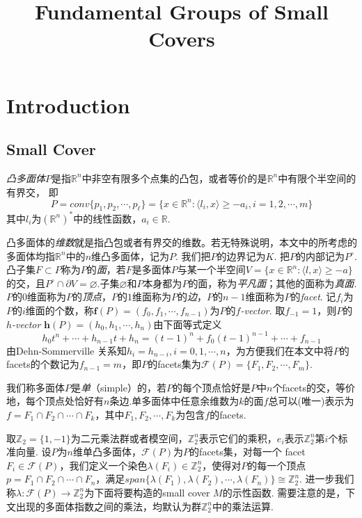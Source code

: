 \documentclass{article}
\title{Fundamental Groups of Small Covers}
\date{}
\theoremstyle{plain}%
\theoremstyle{definition}
\theoremstyle{remark}
\begin{document}
\maketitle
\section{Introduction}
\subsection{Small Cover}
{\em 凸多面体$P$}是指$\mathbb{R}^n$中非空有限多个点集的凸包，或者等价的是$\mathbb{R}^n$中有限个半空间的有界交，
即
$$P=conv\{p_1,p_2,\cdots,p_{\ell}\}=\{x\in \mathbb{R}^n :\langle l_i,x\rangle\geq -a_i,i=1,2,\cdots,m\}$$
其中$l_i$为$(\mathbb{R}^n)^*$中的线性函数，$a_i\in \mathbb{R}$.

凸多面体的{\em 维数}就是指凸包或者有界交的维数。若无特殊说明，本文中的所考虑的多面体均指$\mathbb{R}^n$中的$n$维凸多面体，记为$P$. 我们把$P$的边界记为$K$. 把$P$的内部记为$P^{\circ}$. 凸子集$F\subset P$称为$P$的{\em 面}，若$F$是多面体$P$与某一个半空间$V=\{x\in \mathbb{R}^n :\langle l,x\rangle\geq -a\}$的交，且$P^{\circ}\cap \partial V =\varnothing$.子集$\varnothing$和$P$本身都为$P$的面，称为{\em 平凡面}；其他的面称为{\em 真面}. $P$的$0$维面称为$P$的{\em 顶点}，$P$的$1$维面称为$P$的{\em 边}，$P$的$n-1$维面称为$P$的{\em facet}. 记$f_i$为$P$的$i$维面的个数，称$\mathbf{f}(P)=(f_0,f_1,\cdots,f_{n-1})$为$P$的{\em $f$-vector}. 取$f_{-1}=1$，则$P$的{\em $h$-vector} $\mathbf{h}(P)=(h_0,h_1,\cdots,h_n)$由下面等式定义
$$h_0 t^n+\cdots+h_{n-1}t+h_n=(t-1)^n+f_0(t-1)^{n-1}+\cdots+f_{n-1}$$
由Dehn-Sommerville 关系知$h_i=h_{n-i},i=0,1,\cdots,n$，为方便我们在本文中将$P$的facets的个数记为$f_{n-1}=m$，即$P$的facets集为$\mathcal{F}(P)=\{F_1,F_2,\cdots,F_m\}$.

我们称多面体$P$是{\em 单}（simple）的，若$P$的每个顶点恰好是$P$中$n$个facets的交，等价地，每个顶点处恰好有$n$条边.单多面体中任意余维数为$k$的面$f$总可以(唯一)表示为$f=F_1\cap F_2 \cap \cdots \cap F_k$，其中$F_1,F_2,\cdots,F_k$为包含$f$的facets.


取$\mathbb{Z}_2=\{1,-1\}$为二元乘法群或者模空间，$\mathbb{Z}_2^n$表示它们的乘积，$e_i$表示$\mathbb{Z}_2^n$第$i$个标准向量. 
设$P$为$n$维单凸多面体，$\mathcal{F}(P)$为$P$的facets集，对每一个 facet $F_i\in \mathcal{F}(P)$，我们定义一个染色$\lambda(F_i)\in \mathbb{Z}_2^n$，使得对$P$的每一个顶点$p=F_1\cap F_2 \cap \cdots \cap F_n$，满足$span\{\lambda(F_1),\lambda(F_2),\cdots,\lambda(F_n)\}\cong \mathbb{Z}_2^n$. 进一步我们称$\lambda:\mathcal{F}(P)\longrightarrow \mathbb{Z}_2^n$为下面将要构造的small cover $M$的示性函数. 需要注意的是，下文出现的多面体指数之间的乘法，均默认为群$\mathbb{Z}_2^n$中的乘法运算. 
\end{document}
